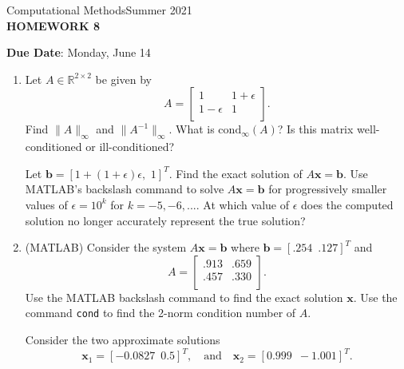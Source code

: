 \documentclass[12pt]{article}
\begin{document}
\begin{center}
Computational Methods\qquad Summer 2021
\\

\textbf{\large HOMEWORK 8}\\
\end{center}
\noindent \textbf{Due Date}: Monday, June 14\\

\begin{enumerate}
\item Let $A\in \mathbb{R}^{2\times 2}$ be given by
	\[\displaystyle{A = \begin{bmatrix}
    1 & 1+\epsilon \\
    1-\epsilon & 1 \\
	\end{bmatrix}}.\]
Find $\|A\|_\infty$ and $\|A^{-1}\|_\infty$. What is $\mathrm{cond}_\infty(A)$? Is this matrix well-conditioned or ill-conditioned?

Let $\mathbf{b}=[1+(1+\epsilon)\epsilon,\,\,1]^T$. Find the exact solution of $A\mathbf{x}=\mathbf{b}$. Use MATLAB's backslash command to solve $A\mathbf{x}=\mathbf{b}$ for progressively smaller values of $\epsilon = 10^k$ for $k=-5,-6,...$. At which value of $\epsilon$ does the computed solution no longer accurately represent the true solution? 
\item (MATLAB) Consider the system $A\mathbf{x}=\mathbf{b}$
where $\mathbf{b}=[.254\,\,\, .127]^T$ and 
	\[\displaystyle{A = \begin{bmatrix}
    .913 & .659 \\
    .457 & .330 \\
	\end{bmatrix}}.\]
Use the MATLAB backslash command to find the exact solution $\mathbf{x}$. Use the command \texttt{cond} to find the 2-norm condition number of $A$.

Consider the two approximate solutions 
\[\mathbf{x}_1 = [-0.0827\,\,\, 0.5]^T,\quad\mathrm{and}\quad\mathbf{x}_2 = [0.999\,\,\, -1.001]^T.\]


\end{enumerate}
\end{document}
